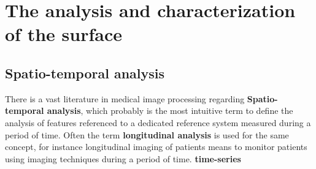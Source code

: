 \chapter{The analysis and characterization of the surface}



\section{Spatio-temporal analysis}
There is a vast literature in medical image processing regarding \textbf{Spatio-temporal analysis}, which probably is the most intuitive term to define the analysis of features referenced to a dedicated reference system measured during a period of time. Often the term \textbf{longitudinal analysis} is used for the same concept, for instance longitudinal imaging of patients means to monitor patients using imaging techniques  during a period of time.  %
\textbf{time-series}